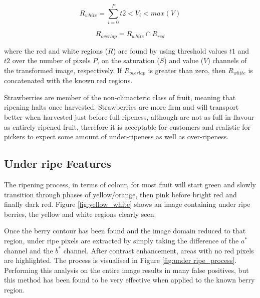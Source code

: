 \documentclass[fleqn,twoside,12pt]{report}
\begin{document}
\begin{equation}
R_{white} = \sum_{i=0}^{P}t2<V_i<max(V)
\label{white_berry_thresh}
\end{equation}

\begin{equation}
R_{overlap} = R_{white} \cap R_{red}
\label{intersect_white_berry}
\end{equation}

where the red and white regions ($R$) are found by using threshold values $t1$ and $t2$ over the number of pixels $P$, on the saturation ($S$) and value ($V$) channels of the transformed image, respectively. If $R_{overlap}$ is greater than zero, then $R_{white}$ is concatenated with the known red regions. 

Strawberries are member of the non-climacteric class of fruit, meaning that ripening halts once harvested. Strawberries are more firm and will transport better when harvested just before full ripeness, although are not as full in flavour as entirely ripened fruit\cite{artur}, therefore it is acceptable for customers and realistic for pickers to expect some amount of under-ripeness as well as over-ripeness. 


\subsection{Under ripe Features}

The ripening process, in terms of colour, for most fruit will start green and slowly transition through phases of yellow/orange, then pink before bright red and finally dark red. Figure \ref{fig:yellow_white} shows an image containing under ripe berries, the yellow and white regions clearly seen.

Once the berry contour has been found and the image domain reduced to that region, under ripe pixels are extracted by simply taking the difference of the $a^*$ channel and the $b^*$ channel. After contrast enhancement, areas with no red pixels are highlighted. The process is visualised in Figure \ref{fig:under ripe_process}. Performing this analysis on the entire image results in many false positives, but this method has been found to be very effective when applied to the known berry region.   
\end{document}
